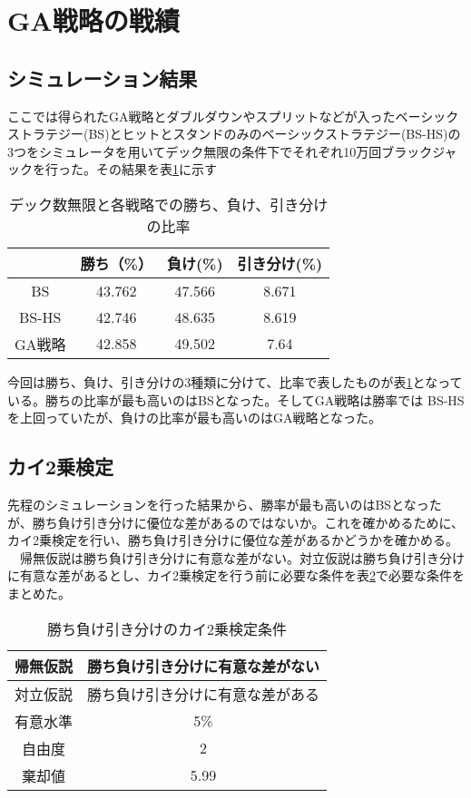 \section{GA戦略の戦績}
\subsection{シミュレーション結果}
ここでは得られたGA戦略とダブルダウンやスプリットなどが入ったベーシックストラテジー(BS)とヒットとスタンドのみのベーシックストラテジー(BS-HS)の3つをシミュレータを用いてデック無限の条件下でそれぞれ10万回ブラックジャックを行った。その結果を表\ref{tab:score}に示す

\begin{table}[H]
 \caption{デック数無限と各戦略での勝ち、負け、引き分けの比率}
 \begin{center}
  \begin{tabular}{|c|c|c|c|}
  \hline   & 勝ち（\%） & 負け(\%)  & 引き分け(\%) \\
  \hline BS & 43.762 & 47.566 & 8.671 \\
  \hline BS-HS & 42.746 & 48.635 & 8.619 \\
  \hline GA戦略 & 42.858 & 49.502 & 7.64 \\
  \hline
  \end{tabular}
  \label{tab:score}
 \end{center}
\end{table}

今回は勝ち、負け、引き分けの3種類に分けて、比率で表したものが表\ref{tab:score}となっている。勝ちの比率が最も高いのはBSとなった。そしてGA戦略は勝率では BS-HSを上回っていたが、負けの比率が最も高いのはGA戦略となった。

\subsection{カイ2乗検定}
先程のシミュレーションを行った結果から、勝率が最も高いのはBSとなったが、勝ち負け引き分けに優位な差があるのではないか。これを確かめるために、カイ2乗検定を行い、勝ち負け引き分けに優位な差があるかどうかを確かめる。
　帰無仮説は勝ち負け引き分けに有意な差がない。対立仮説は勝ち負け引き分けに有意な差があるとし、カイ2乗検定を行う前に必要な条件を表\ref{score-x}で必要な条件をまとめた。
\begin{table}[H]
 \caption{勝ち負け引き分けのカイ2乗検定条件\label{score-x}}
 \begin{center}
  \begin{tabular}{|c|c|}
  \hline 帰無仮説 & 勝ち負け引き分けに有意な差がない \\
  \hline 対立仮説 & 勝ち負け引き分けに有意な差がある \\
  \hline 有意水準 & 5\% \\
  \hline 自由度 & 2 \\
  \hline 棄却値 & 5.99 \\
  \hline
  \end{tabular}
 \end{center}
\end{table}

